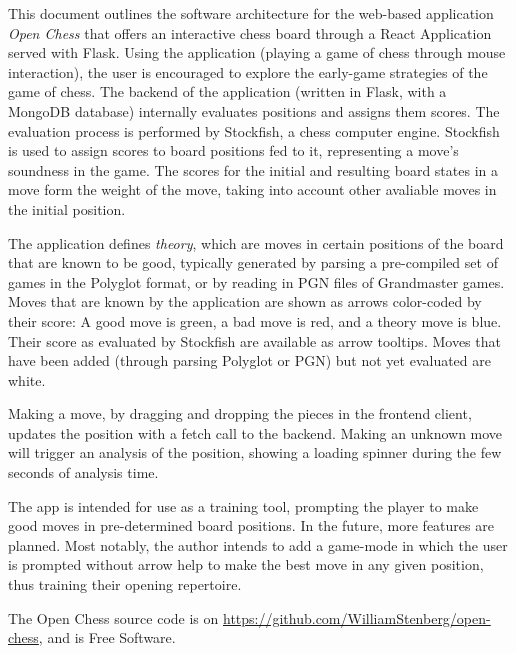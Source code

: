 \documentclass[architecture.tex]{subfiles}
\begin{document}
This document outlines the software architecture for the 
web-based application \textit{Open Chess} that offers
an interactive chess board through a React Application
served with Flask. 
Using the application (playing a game of chess through mouse interaction),
the user is encouraged to explore the early-game strategies of the game of chess.
The backend of the application (written in Flask, with a MongoDB database) 
internally evaluates positions and assigns them scores. 
The evaluation process is performed by Stockfish, a chess computer engine. 
Stockfish is used to assign scores to board positions fed to it, 
representing a move's soundness in the game. 
The scores for the initial and resulting board states in a move
form the weight of the move, taking into account 
other avaliable moves in the initial position.

The application defines \textit{theory}, which are moves in certain
positions of the board that are known to be good, typically generated by
parsing a pre-compiled set of games in the Polyglot format, or by reading
in PGN files of Grandmaster games.
Moves that are known by the application are shown as arrows color-coded by their
score: A good move is green, a bad move is red, and a theory move is blue.
Their score as evaluated by Stockfish are available as arrow tooltips.
Moves that have been added (through parsing Polyglot or PGN) but not yet evaluated
are white.

Making a move, by dragging and dropping the pieces in the frontend client,
updates the position with a fetch call to the backend. Making an unknown move
will trigger an analysis of the position, showing a loading spinner during
the few seconds of analysis time.

The app is intended for use as a training tool, prompting the player
to make good moves in pre-determined board positions.
In the future, more features are planned. Most notably, the author intends to
add a game-mode in which the user is prompted without arrow help to make the
best move in any given position, thus training their opening repertoire.

The Open Chess source code is on \url{https://github.com/WilliamStenberg/open-chess},
and is Free Software.
\end{document}
